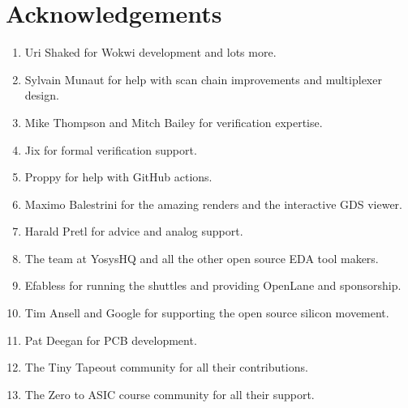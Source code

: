 \section{Acknowledgements}
\label{sec:acknowledgements}

\begin{enumerate}
    \item Uri Shaked for Wokwi development and lots more.
    \item Sylvain Munaut for help with scan chain improvements and multiplexer design.
    \item Mike Thompson and Mitch Bailey for verification expertise.
    \item Jix for formal verification support.
    \item Proppy for help with GitHub actions.
    \item Maximo Balestrini for the amazing renders and the interactive GDS viewer.
    \item Harald Pretl for advice and analog support.
    \item The team at YosysHQ and all the other open source EDA tool makers.
    \item Efabless for running the shuttles and providing OpenLane and sponsorship.
    \item Tim Ansell and Google for supporting the open source silicon movement.
    \item Pat Deegan for PCB development.
    \item The Tiny Tapeout community for all their contributions.
    \item The Zero to ASIC course community for all their support.
\end{enumerate}
